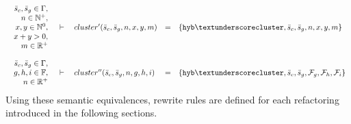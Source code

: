 \documentclass[final]{jfp1}
\newcommand{\f}[0]{\bar{f}}
\newcommand{\s}[0]{\bar{s}}
\newcommand{\blf}[0]{\mathbb{F}}
\newcommand{\bs}[0]{\mathbb{S}}
\newcommand{\bn}[0]{\mathbb{N}}
\newcommand{\br}[0]{\mathbb{R}}
\newcommand{\bnp}[0]{\bn^{+}}
\newcommand{\bnz}[0]{\bn^{0}}
\newcommand{\brp}[0]{\br^{+}}
\newcommand{\ing}[1]{#1 \in{} \Gamma}
\newcommand{\seq}[3]{#1 & \vdash{} & #2 & = & #3}
\newcommand{\Rewrite}[3]{#1 & \vdash{} & #2 & \mapsto{}^{\!\!\!*} & #3}
\begin{document}
\[
  \begin{array}{rclcl}
    \seq{
    \begin{array}{r}
      \ing{\s_c, \s_g}, \\
      n \in \bnp, \\
      x,y \in \bnz, \\
      x + y > 0, \\
      m \in \brp
    \end{array}
    }{cluster'(\s_c, \s_g, n, x, y, m)}{\{\mathtt{hyb\textunderscore cluster},
    \s_c, \s_g, n, x, y, m\}} \\[8ex]
    \seq{
    \begin{array}{r}
      \ing{\s_c, \s_g}, \\
      g,h,i \in \blf, \\
      n \in \brp
    \end{array}
    }{cluster''(\s_c, \s_g, n, g, h, i)}
    {\{\mathtt{hyb\textunderscore cluster}, \s_c, \s_g, \mathcal{F}_g, \mathcal{F}_h, \mathcal{F}_i\}}
  \end{array}
\]
% 
Using these semantic equivalences, rewrite rules are defined for each
refactoring introduced in the following sections.

\end{document}
